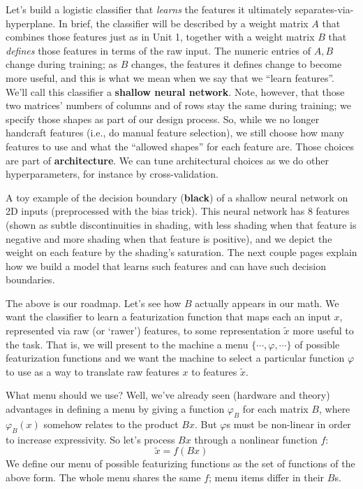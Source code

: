 Let's build a logistic classifier that \emph{learns} the features it ultimately
separates-via-hyperplane.  In brief, the classifier will be described by a
weight matrix $A$ that combines those features just as in Unit 1, together with
a weight matrix $B$ that \emph{defines} those features in terms of the raw
input.  The numeric entries of $A, B$ change during training; as $B$ changes,
the features it defines change to become more useful, and this is what we mean
when we say that we ``learn features''.  We'll call this classifier a
\textbf{shallow neural network}.
%
Note, however, that those two matrices' numbers of columns and of rows stay the
same during training; we specify those shapes as part of our design process.
So, while we no longer handcraft features (i.e., do manual feature selection),
we still choose how many features to use and what the ``allowed shapes'' for
each feature are.  Those choices are part of \textbf{architecture}.  We can
tune architectural choices as we do other hyperparameters, for instance by
cross-validation.

\begin{marginfigure}[-0cm]
    \centering
    \caption{A toy example of the decision boundary (\textbf{black}) of a
    shallow neural network on 2D inputs (preprocessed with the bias trick).
    This neural network has 8 features (shown as subtle discontinuities in
    shading, with less shading when that feature is negative and more shading
    when that feature is positive), and we depict the weight on each feature by
    the shading's saturation.  The next couple pages explain how we build a model
    that learns such features and can have such decision boundaries.}
\end{marginfigure}

The above is our roadmap.  Let's see how $B$ actually appears in our math.
We want the classifier to learn a featurization function that
maps each an input $x$, represented via raw (or `rawer') features, to some
representation $\tilde x$ more useful to the task.  That is, we will present to
the machine a menu $\{\cdots, \varphi, \cdots\}$ of possible featurization
functions and we want the machine to select a particular function $\varphi$ to
use as a way to translate raw features $x$ to features $\tilde x$.

What menu should we use?  Well, we've already seen (hardware and theory)
advantages in defining a menu by giving a function $\varphi_B$ for each matrix
$B$, where $\varphi_B(x)$ somehow relates to the product $Bx$.  But
$\varphi$s must be non-linear in order to increase expressivity.  So let's
process $Bx$ through a nonlinear function $f$:
$$
  \tilde x = f(Bx)
$$
We define our menu of possible featurizing functions as the set of functions of
the above form.  The whole menu shares the same $f$; menu items differ in their
$B$s.



